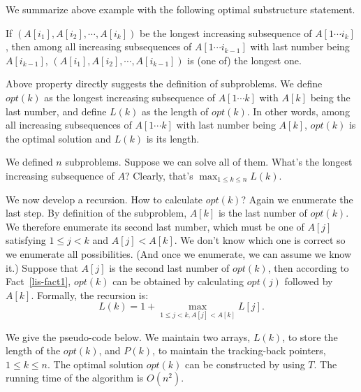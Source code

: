We summarize above example with the following optimal substructure statement.
\begin{fact}\label{lis-fact1}
If $(A[i_1], A[i_2], \cdots, A[i_k])$ be the longest increasing subsequence of $A[1\cdots i_k]$,
then among all increasing subsequences of $A[1\cdots i_{k-1}]$ with last number being $A[i_{k-1}]$,
$(A[i_1], A[i_2], \cdots, A[i_{k-1}])$ is (one of) the longest one. 
\end{fact}

Above property directly suggests the definition of subproblems.
We define $opt(k)$ as the longest increasing subsequence
of $A[1\cdots k]$ with $A[k]$ being the last number,
and define $L(k)$ as the length of $opt(k)$.
In other words, among all increasing subsequences of $A[1\cdots k]$ with last number being $A[k]$,
$opt(k)$ is the optimal solution and $L(k)$ is its length.

We defined $n$ subproblems. Suppose we can solve all of them.
What's the longest increasing subsequence of $A$?
Clearly, that's $\max_{1\le k \le n} L(k)$.

We now develop a recursion. 
How to calculate $opt(k)$?
Again we enumerate the last step. By definition of the subproblem, $A[k]$ is the last number of $opt(k)$.
We therefore enumerate its second last number, which must be one of $A[j]$ satisfying $1\le j < k$ and $A[j] < A[k]$.
We don't know which one is correct so we enumerate all possibilities.
(And once we enumerate, we can assume we know it.)
Suppose that $A[j]$ is the second last number of $opt(k)$, then according to Fact~\ref{lis-fact1},
$opt(k)$ can be obtained by calculating $opt(j)$ followed by $A[k]$.
Formally, the recursion is:
$$\textstyle L(k) = 1 + \max_{1 \le j < k, A[j] < A[k]} L[j].$$

We give the pseudo-code below.
We maintain two arrays, $L(k)$, to store the length of the $opt(k)$,
and $P(k)$, to maintain the tracking-back pointers, $1 \le k \le n$.
The optimal solution $opt(k)$ can be constructed by using $T$.
The running time of the algorithm is $O(n^2)$.

\begin{minipage}{0.8\textwidth}
	\xxx
	\xxx
	\xxx
	\xxx
	\xxx
	\xxx
	\xxx
	\xxx
	\xxx
	\xxx
	\xxx
	\xxx
	\xxx
\end{minipage}

